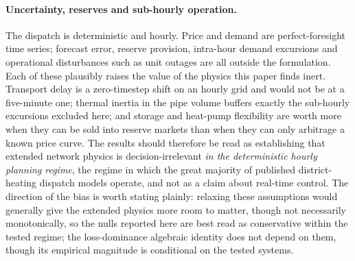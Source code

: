 
\paragraph{Uncertainty, reserves and sub-hourly operation.}
The dispatch is deterministic and hourly. Price and demand are perfect-foresight time
series; forecast error, reserve provision, intra-hour demand excursions and operational
disturbances such as unit outages are all outside the formulation. Each of these plausibly
raises the value of the physics this paper finds inert. Transport delay is a zero-timestep
shift on an hourly grid and would not be at a five-minute one; thermal inertia in the pipe
volume buffers exactly the sub-hourly excursions excluded here; and storage and heat-pump
flexibility are worth more when they can be sold into reserve markets than when they can
only arbitrage a known price curve. The results should therefore be read as establishing
that extended network physics is decision-irrelevant \emph{in the deterministic hourly
planning regime}, the regime in which the great majority of published district-heating
dispatch models operate, and not as a claim about real-time control. The direction of
the bias is worth stating plainly: relaxing these assumptions would generally give the
extended physics more room to matter, though not necessarily monotonically, so the nulls
reported here are best read as conservative within the tested regime; the loss-dominance
algebraic identity does not depend on them, though its empirical magnitude is conditional on
the tested systems.

